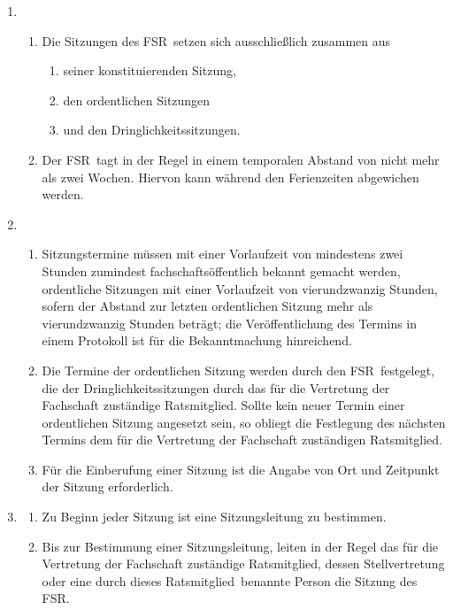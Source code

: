 \documentclass[a4paper, 12pt, ngerman]{article}
\newcommand{\rat}{FSR}
\newcommand{\rates}{FSR}
\newcommand{\mitglied}{Ratsmitglied}
\begin{document}
\begin{enumerate}[leftmargin=0cm]
	
	\item {}
	
	\begin{enumerate}[leftmargin=0cm]
		\item Die Sitzungen des \rates~setzen sich ausschließlich zusammen aus 
		\begin{enumerate}[leftmargin=0.5cm]
			\item seiner konstituierenden Sitzung,
			\item den ordentlichen Sitzungen
			\item und den Dringlichkeitssitzungen.
		\end{enumerate}
		\item Der \rat~tagt in der Regel in einem temporalen Abstand von nicht mehr als zwei Wochen. Hiervon kann während den Ferienzeiten abgewichen werden.
	\end{enumerate}
	
	\item {}
	
	\begin{enumerate}[leftmargin=0cm]
		\item Sitzungstermine müssen mit einer Vorlaufzeit von mindestens zwei Stunden zumindest fachschaftsöffentlich bekannt gemacht werden, ordentliche Sitzungen mit einer Vorlaufzeit von vierundzwanzig Stunden, sofern der Abstand zur letzten ordentlichen Sitzung mehr als vierundzwanzig Stunden beträgt; die Veröffentlichung des Termins in einem Protokoll ist für die Bekanntmachung hinreichend.
		\item Die Termine der ordentlichen Sitzung werden durch den \rat~festgelegt, die der Dringlichkeitssitzungen durch das für die Vertretung der Fachschaft zuständige \mitglied. Sollte kein neuer Termin einer ordentlichen Sitzung angesetzt sein, so obliegt die Festlegung des nächsten Termins dem für die Vertretung der Fachschaft zuständigen \mitglied.
		\item Für die Einberufung einer Sitzung ist die Angabe von Ort und Zeitpunkt der Sitzung erforderlich.
		
	\end{enumerate}
	
	\item {}\label{sitzungsleitung}
	
	\begin{enumerate}[leftmargin=0cm]
	\item Zu Beginn jeder Sitzung ist eine Sitzungsleitung zu bestimmen. 
	\item Bis zur Bestimmung einer Sitzungsleitung, leiten in der Regel das für die Vertretung der Fachschaft zuständige \mitglied , dessen Stellvertretung oder eine durch dieses \mitglied~benannte Person die Sitzung des \rates.
	\end{enumerate}
	

\end{enumerate}
\end{document}
